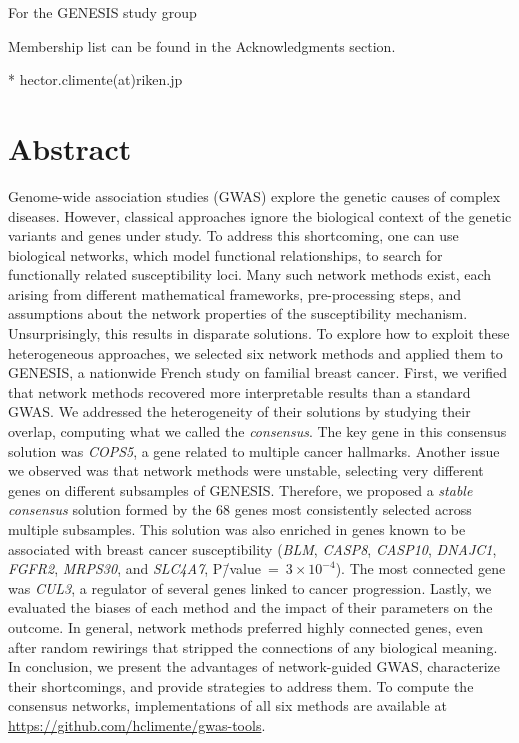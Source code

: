 \documentclass[10pt,letterpaper]{article}
\begin{document}
\begin{flushleft}
\textcurrency For the GENESIS study group %


\textpilcrow Membership list can be found in the Acknowledgments section.

* hector.climente(at)riken.jp

\end{flushleft}
\section*{Abstract}
Genome-wide association studies (GWAS) explore the genetic causes of complex diseases. However, classical approaches ignore the biological context of the genetic variants and genes under study. To address this shortcoming, one can use biological networks, which model functional relationships, to search for functionally related susceptibility loci. Many such network methods exist, each arising from different mathematical frameworks, pre-processing steps, and assumptions about the network properties of the susceptibility mechanism. Unsurprisingly, this results in disparate solutions. To explore how to exploit these heterogeneous approaches, we selected six network methods and applied them to GENESIS, a nationwide French study on familial breast cancer. First, we verified that network methods recovered more interpretable results than a standard GWAS. We addressed the heterogeneity of their solutions by studying their overlap, computing what we called the \emph{consensus}. The key gene in this consensus solution was \emph{COPS5}, a gene related to multiple cancer hallmarks. Another issue we observed was that network methods were unstable, selecting very different genes on different subsamples of GENESIS. Therefore, we proposed a \emph{stable consensus} solution formed by the 68 genes most consistently selected across multiple subsamples. This solution was also enriched in genes known to be associated with breast cancer susceptibility (\emph{BLM}, \emph{CASP8}, \emph{CASP10}, \emph{DNAJC1}, \emph{FGFR2}, \emph{MRPS30}, and \emph{SLC4A7}, P\=/value~=~$3 \times 10^{-4}$). The most connected gene was \emph{CUL3}, a regulator of several genes linked to cancer progression. Lastly, we evaluated the biases of each method and the impact of their parameters on the outcome. In general, network methods preferred highly connected genes, even after random rewirings that stripped the connections of any biological meaning. In conclusion, we present the advantages of network-guided GWAS, characterize their shortcomings, and provide strategies to address them. To compute the consensus networks, implementations of all six methods are available at \url{https://github.com/hclimente/gwas-tools}.
\end{document}
